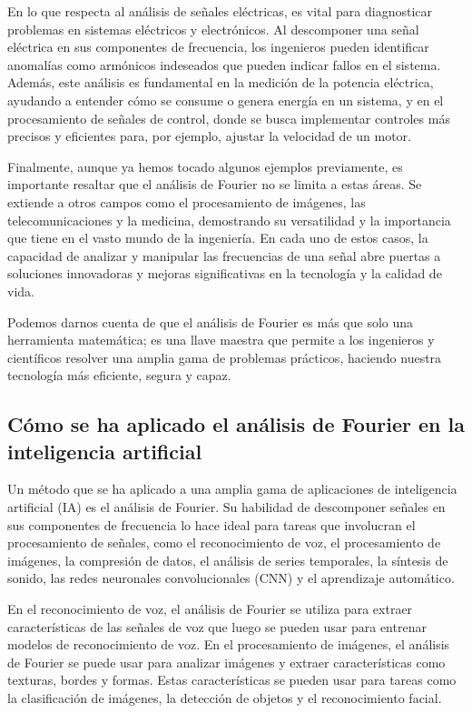 En lo que respecta al análisis de señales eléctricas, es vital para diagnosticar problemas en sistemas eléctricos y electrónicos. Al descomponer una señal eléctrica en sus componentes de frecuencia, los ingenieros pueden identificar anomalías como armónicos indeseados que pueden indicar fallos en el sistema. Además, este análisis es fundamental en la medición de la potencia eléctrica, ayudando a entender cómo se consume o genera energía en un sistema, y en el procesamiento de señales de control, donde se busca implementar controles más precisos y eficientes para, por ejemplo, ajustar la velocidad de un motor.

Finalmente, aunque ya hemos tocado algunos ejemplos previamente, es importante resaltar que el análisis de Fourier no se limita a estas áreas. Se extiende a otros campos como el procesamiento de imágenes, las telecomunicaciones y la medicina, demostrando su versatilidad y la importancia que tiene en el vasto mundo de la ingeniería. En cada uno de estos casos, la capacidad de analizar y manipular las frecuencias de una señal abre puertas a soluciones innovadoras y mejoras significativas en la tecnología y la calidad de vida.

Podemos darnos cuenta de que el análisis de Fourier es más que solo una herramienta matemática; es una llave maestra que permite a los ingenieros y científicos resolver una amplia gama de problemas prácticos, haciendo nuestra tecnología más eficiente, segura y capaz.

\subsection{Cómo se ha aplicado el análisis de Fourier en la inteligencia artificial}

Un método que se ha aplicado a una amplia gama de aplicaciones de inteligencia artificial (IA) es el análisis de Fourier. Su habilidad de descomponer señales en sus componentes de frecuencia lo hace ideal para tareas que involucran el procesamiento de señales, como el reconocimiento de voz, el procesamiento de imágenes, la compresión de datos, el análisis de series temporales, la síntesis de sonido, las redes neuronales convolucionales (CNN) y el aprendizaje automático.

En el reconocimiento de voz, el análisis de Fourier se utiliza para extraer características de las señales de voz que luego se pueden usar para entrenar modelos de reconocimiento de voz. En el procesamiento de imágenes, el análisis de Fourier se puede usar para analizar imágenes y extraer características como texturas, bordes y formas. Estas características se pueden usar para tareas como la clasificación de imágenes, la detección de objetos y el reconocimiento facial.

